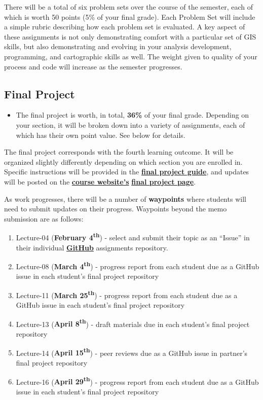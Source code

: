 \documentclass[
]{book}
\providecommand{\tightlist}{%
  \setlength{\itemsep}{0pt}\setlength{\parskip}{0pt}}
\newenvironment{rmdblock}[1]
  {\begin{shaded*}
  \begin{itemize}
  \renewcommand{\labelitemi}{
    \raisebox{-.7\height}[0pt][0pt]{
      {\setkeys{Gin}{width=3em,keepaspectratio}\texttt{[image: images/\#1]}}
    }
  }
  \item
  }
  {
  \end{itemize}
  \end{shaded*}
  }
\newenvironment{rmdtip}
  {\begin{rmdblock}{tip}}
  {\end{rmdblock}}
\begin{document}
There will be a total of six problem sets over the course of the semester, each of which is worth 50 points (5\% of your final grade). Each Problem Set will include a simple rubric describing how each problem set is evaluated. A key aspect of these assignments is not only demonstrating comfort with a particular set of GIS skills, but also demonstrating and evolving in your analysis development, programming, and cartographic skills as well. The weight given to quality of your process and code will increase as the semester progresses.

\hypertarget{final-project}{%
\subsection{Final Project}\label{final-project}}

\begin{rmdtip}
The final project is worth, in total, \textbf{36\%} of your final grade.
Depending on your section, it will be broken down into a variety of
assignments, each of which has their own point value. See below for
details.
\end{rmdtip}

The final project corresponds with the fourth learning outcome. It will be organized slightly differently depending on which section you are enrolled in. Specific instructions will be provided in the \href{https://slu-soc5650.github.io/finalGuide}{\textbf{final project guide}}, and updates will be posted on the \href{https://slu-soc5650.github.io/}{\textbf{course website's}} \href{https://slu-soc5650.github.io/final-project}{\textbf{final project page}}.

As work progresses, there will be a number of \textbf{waypoints} where students will need to submit updates on their progress. Waypoints beyond the memo submission are as follows:

\begin{enumerate}
\def\labelenumi{\arabic{enumi}.}
\tightlist
\item
  Lecture-04 (\textbf{February 4\textsuperscript{th}}) - select and submit their topic as an ``Issue'' in their individual \href{https://github.com/slu-soc5650}{\textbf{GitHub}} assignments repository.
\item
  Lecture-08 (\textbf{March 4\textsuperscript{th}}) - progress report from each student due as a GitHub issue in each student's final project repository
\item
  Lecture-11 (\textbf{March 25\textsuperscript{th}}) - progress report from each student due as a GitHub issue in each student's final project repository
\item
  Lecture-13 (\textbf{April 8\textsuperscript{th}}) - draft materials due in each student's final project repository
\item
  Lecture-14 (\textbf{April 15\textsuperscript{th}}) - peer reviews due as a GitHub issue in partner's final project repository
\item
  Lecture-16 (\textbf{April 29\textsuperscript{th}}) - progress report from each student due as a GitHub issue in each student's final project repository
\end{enumerate}
\end{document}
